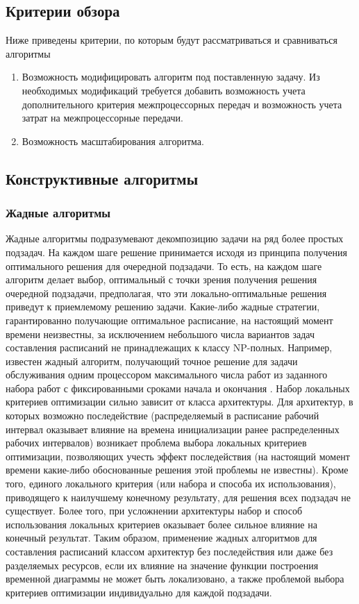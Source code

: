 \subsection{Критерии обзора}
Ниже приведены критерии, по которым будут рассматриваться и сравниваться алгоритмы
\begin{enumerate}
    \item Возможность модифицировать алгоритм под поставленную задачу. Из необходимых модификаций требуется добавить возможность учета дополнительного критерия межпроцессорных передач и возможность учета затрат на межпроцессорные передачи.
    \item Возможность масштабирования алгоритма. 
\end{enumerate}
\subsection{Конструктивные алгоритмы}
\subsubsection{Жадные алгоритмы}
Жадные алгоритмы подразумевают декомпозицию задачи на ряд более простых подзадач. На каждом шаге решение принимается исходя из принципа получения оптимального решения для очередной подзадачи. То есть, на каждом шаге алгоритм делает выбор, оптимальный с точки зрения получения решения очередной подзадачи, предполагая, что эти локально-оптимальные решения приведут к приемлемому решению задачи. Какие-либо жадные стратегии, гарантированно получающие оптимальное расписание, на настоящий момент времени неизвестны, за исключением небольшого числа вариантов задач составления расписаний не принадлежащих к классу NP-полных. Например, известен жадный алгоритм, получающий точное решение для задачи обслуживания одним процессором максимального числа работ из заданного набора работ с фиксированными сроками начала и окончания \cite{Cormen}. Набор локальных критериев оптимизации сильно зависит от класса архитектуры. Для архитектур, в которых возможно последействие (распределяемый в расписание рабочий интервал оказывает влияние на времена инициализации ранее распределенных рабочих интервалов) возникает проблема выбора локальных критериев оптимизации, позволяющих учесть эффект последействия (на настоящий момент времени какие-либо обоснованные решения этой проблемы не известны). Кроме того, единого локального критерия (или набора и способа их использования), приводящего к наилучшему конечному результату, для решения всех подзадач не существует. Более того, при усложнении архитектуры набор и способ использования локальных критериев оказывает более сильное влияние на конечный результат. Таким образом, применение жадных алгоритмов для составления расписаний классом архитектур без последействия или даже без разделяемых ресурсов, если их влияние на значение функции построения временной диаграммы не может быть локализовано, а также проблемой выбора критериев оптимизации индивидуально для каждой подзадачи.

